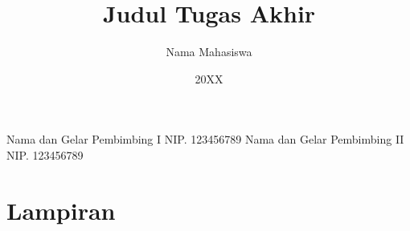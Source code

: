 \documentclass[12pt, a4paper, onecolumn, oneside, final]{report}
\begin{document}

    \title{Judul Tugas Akhir} 	%
    \date{20XX}					%
    \author{Nama Mahasiswa}		%
	\dosbingA%
		{Nama dan Gelar Pembimbing I}%
		{NIP. 123456789}				%
	\dosbingB%
		{Nama dan Gelar Pembimbing II}%
		{NIP. 123456789}				%

    \setcounter{page}{0}

    
    
    

    
    
    
    
    

    \tableofcontents
    \listoffigures
    \listoftables
    

    \renewcommand{\chaptername}{BAB}
    \renewcommand{\thechapter}{\Roman{chapter}}
    \renewcommand\thesection{\arabic{chapter}.\arabic{section}}
    

    \justifying
    
    
    
    
    

    \renewcommand{\bibname}{Daftar Pustaka}
    \printbibliography

    \appendix

    \part*{Lampiran}

    
    
\end{document}
